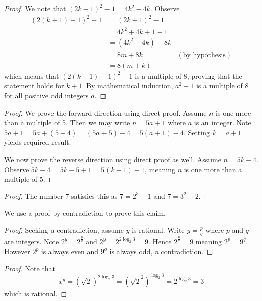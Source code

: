 \begin{questions}
\begin{proof}
        We note that $(2k-1)^2 - 1 = 4k^2 - 4k$. Observe
        \begin{align*}
            (2(k+1)-1)^2 - 1 &= (2k+1)^2 - 1\\
            &= 4k^2 + 4k + 1 - 1\\
            &= (4k^2 - 4k) + 8k\\
            &= 8m + 8k & (\text{by hypothesis})\\
            &= 8(m+k)
        \end{align*}
        which means that $(2(k+1)-1)^2 - 1$ is a multiple of 8, proving that the statement holds for $k+1$. By mathematical induction, $a^2 - 1$ is a multiple of 8 for all positive odd integers $a$.
    \end{proof}

    \item \begin{proof}
        We prove the forward direction using direct proof. Assume $n$ is one more than a multiple of 5. Then we may write $n = 5a + 1$ where $a$ is an integer. Note $5a + 1 = 5a + (5 - 4) = (5a + 5) - 4 = 5(a+1) - 4$. Setting $k = a+1$ yields required result.

        We now prove the reverse direction using direct proof as well. Assume $n = 5k - 4$. Observe $5k - 4 = 5k - 5 + 1 = 5(k-1) + 1$, meaning $n$ is one more than a multiple of 5.
    \end{proof}

    \item \begin{proof}
        The number 7 satisfies this as $7 = 2^3 - 1$ and $7 = 3^2 - 2$.
    \end{proof}

    \item \begin{partquestions}{\roman*}
        \item We use a proof by contradiction to prove this claim.
        
        \begin{proof}
            Seeking a contradiction, assume $y$ is rational. Write $y = \frac pq$ where $p$ and $q$ are integers. Note $2^y = 2^{\frac pq}$ and $2^y = 2^{2\log_2{3}} = 9$. Hence $2^{\frac pq} = 9$ meaning $2^p = 9^q$. However $2^p$ is always even and $9^q$ is always odd, a contradiction.
        \end{proof}

        \item \begin{proof}
            Note that
            \[
                x^y = (\sqrt2)^{2\log_2{3}} = \left(\sqrt{2}^2\right)^{\log_2{3}} = 2^{\log_2{3}} = 3
            \]
            which is rational.
        \end{proof}
    \end{partquestions}
\end{questions}
